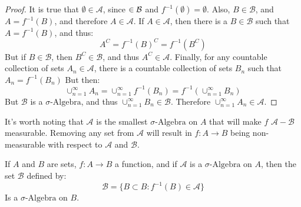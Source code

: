                 \begin{proof}
                    It is true that $\emptyset\in\mathcal{A}$, since
                    $\empty\in\mathcal{B}$ and $f^{-1}(\emptyset)=\emptyset$.
                    Also, $B\in\mathcal{B}$, and $A=f^{-1}(B)$, and therefore
                    $A\in\mathcal{A}$. If $A\in\mathcal{A}$, then
                    there is a $B\in\mathcal{B}$ such that
                    $A=f^{-1}(B)$, and thus:
                    \begin{equation}
                        A^{C}=f^{-1}(B)^{C}=f^{-1}(B^{C})
                    \end{equation}
                    But if $B\in\mathcal{B}$, then $B^{C}\in\mathcal{B}$,
                    and thus $A^{C}\in\mathcal{A}$. Finally, for any
                    countable collection of sets $A_{n}\in\mathcal{A}$,
                    there is a countable collection of sets $B_{n}$ such that
                    $A_{n}=f^{-1}(B_{n})$ But then:
                    \begin{equation}
                        \cup_{n=1}^{\infty}A_{n}=
                        \cup_{n=1}^{\infty}f^{-1}(B_{n})
                        =f^{-1}(\cup_{n=1}^{\infty}B_{n})
                    \end{equation}
                    But $\mathcal{B}$ is a $\sigma\text{-Algebra}$, and
                    thus $\cup_{n=1}^{\infty}B_{n}\in\mathcal{B}$. Therefore
                    $\cup_{n=1}^{\infty}A_{n}\in\mathcal{A}$.
                \end{proof}
                It's worth noting that $\mathcal{A}$ is the smallest
                $\sigma\text{-Algebra}$ on $A$ that will make
                $f$ $\mathcal{A}-\mathcal{B}$ measurable. Removing any set
                from $\mathcal{A}$ will result in $f:A\rightarrow{B}$ being
                non-measurable with respect to $\mathcal{A}$ and
                $\mathcal{B}$.
                \begin{theorem}
                    If $A$ and $B$ are sets, $f:A\rightarrow{B}$ a function,
                    and if $\mathcal{A}$ is a $\sigma\text{-Algebra}$ on
                    $A$, then the set $\mathcal{B}$ defined by:
                    \begin{equation}
                        \mathcal{B}=
                        \{B\subset{B}:f^{-1}(B)\in\mathcal{A}\}
                    \end{equation}
                    Is a $\sigma\text{-Algebra}$ on $B$.
                \end{theorem}
